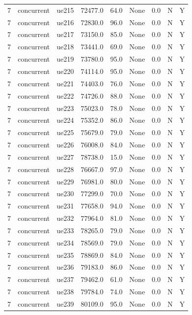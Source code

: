 \begin{table}[ht]
\begin{tabular}{|c|c|c|c|c|c|c|c|c|}
7 & concurrent & ue215 & 72477.0 & 64.0 & None & 0.0 & N & Y \\
7 & concurrent & ue216 & 72830.0 & 96.0 & None & 0.0 & N & Y \\
7 & concurrent & ue217 & 73150.0 & 85.0 & None & 0.0 & N & Y \\
7 & concurrent & ue218 & 73441.0 & 69.0 & None & 0.0 & N & Y \\
7 & concurrent & ue219 & 73780.0 & 95.0 & None & 0.0 & N & Y \\
7 & concurrent & ue220 & 74114.0 & 95.0 & None & 0.0 & N & Y \\
7 & concurrent & ue221 & 74403.0 & 76.0 & None & 0.0 & N & Y \\
7 & concurrent & ue222 & 74726.0 & 88.0 & None & 0.0 & N & Y \\
7 & concurrent & ue223 & 75023.0 & 78.0 & None & 0.0 & N & Y \\
7 & concurrent & ue224 & 75352.0 & 86.0 & None & 0.0 & N & Y \\
7 & concurrent & ue225 & 75679.0 & 79.0 & None & 0.0 & N & Y \\
7 & concurrent & ue226 & 76008.0 & 84.0 & None & 0.0 & N & Y \\
7 & concurrent & ue227 & 78738.0 & 15.0 & None & 0.0 & N & Y \\
7 & concurrent & ue228 & 76667.0 & 97.0 & None & 0.0 & N & Y \\
7 & concurrent & ue229 & 76981.0 & 80.0 & None & 0.0 & N & Y \\
7 & concurrent & ue230 & 77299.0 & 70.0 & None & 0.0 & N & Y \\
7 & concurrent & ue231 & 77658.0 & 94.0 & None & 0.0 & N & Y \\
7 & concurrent & ue232 & 77964.0 & 81.0 & None & 0.0 & N & Y \\
7 & concurrent & ue233 & 78265.0 & 79.0 & None & 0.0 & N & Y \\
7 & concurrent & ue234 & 78569.0 & 79.0 & None & 0.0 & N & Y \\
7 & concurrent & ue235 & 78869.0 & 84.0 & None & 0.0 & N & Y \\
7 & concurrent & ue236 & 79183.0 & 86.0 & None & 0.0 & N & Y \\
7 & concurrent & ue237 & 79462.0 & 61.0 & None & 0.0 & N & Y \\
7 & concurrent & ue238 & 79784.0 & 74.0 & None & 0.0 & N & Y \\
7 & concurrent & ue239 & 80109.0 & 95.0 & None & 0.0 & N & Y \\

\end{tabular}
\end{table}
